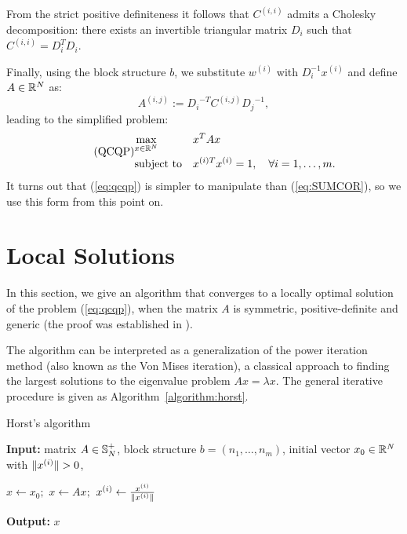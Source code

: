 From the strict positive definiteness it follows that $C^{(i,i)}$ admits a Cholesky
decomposition: there exists an invertible triangular matrix $D_i$ such that $C^{(i,i)} = D_i^T D_i$.

Finally, using the block structure $b$, we substitute $w^{(i)}$
with $D_i^{-1} x^{(i)}$ and define $A \in \mathbb{R}^N$ as:
\begin{equation*}
A^{(i,j)} := {D_i}^{-T} C^{(i,j)} {D_j}^{-1},
\end{equation*}
leading to the simplified problem:
 \begin{equation}\label{eq:qcqp}
\tag{QCQP}
\begin{aligned}
& \underset{x \in \mathbb{R}^{N}}{\text{max}}
& & x^T A x\\
& \text{subject to}
& &x^{(i)T} x^{(i)} = 1, \quad\forall i = 1, \ldots, m.
\end{aligned}
\end{equation}
It turns out that (\ref{eq:qcqp}) is simpler to  manipulate than  (\ref{eq:SUMCOR}), so we use this form from this point on.

\section{Local Solutions}\label{chap:extensions:horst}
In this section, we give an algorithm that converges to a locally optimal
solution of the problem (\ref{eq:qcqp}), when the matrix $A$ is symmetric,
positive-definite and generic (the proof was established in \cite{Chu}).

The algorithm can be interpreted as a generalization of the power
iteration method (also known as the Von Mises iteration), a classical
approach to finding the largest solutions to the eigenvalue problem
$A x = \lambda x$.  The general iterative procedure is given
as Algorithm~\ref{algorithm:horst}.
\begin{algorithm}
\caption{Horst's algorithm}
\label{algorithm:horst}
{\bf Input:} matrix $A \in \mathbb{S}_N^+$, block structure $b = \left(n_1,\ldots,n_m\right)$,
initial vector $x_0 \in \mathbb{R}^N$ with $\lVert x^{(i)}\rVert > 0$,  \par
\begin{algorithmic}
\STATE $x \leftarrow x_0;$
\STATE $x \leftarrow A x;$
\STATE $x^{(i)} \leftarrow \frac{x^{(i)}}{\lVert x^{(i)}\rVert}$
\ENDFOR
\ENDFOR
\end{algorithmic}
{\bf Output:} $x$
\end{algorithm}

